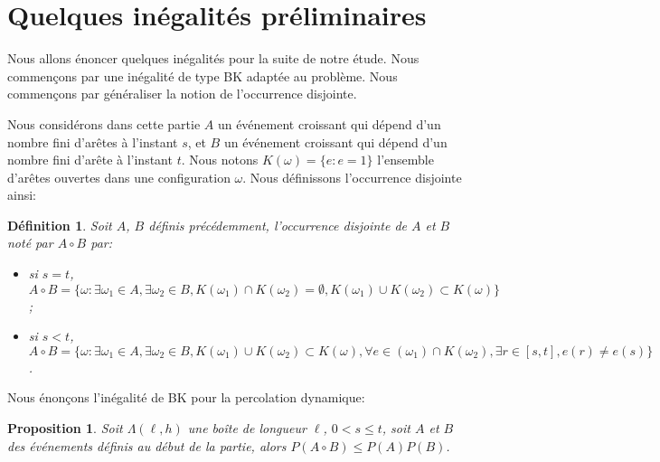 \documentclass[titlepage,a4paper,12pt]{article}
\newcounter{def}
\newcounter{prop}
\newtheorem{occ}[def]{Définition}
\newtheorem{bk}[prop]{Proposition}
\begin{document}
\section{Quelques inégalités préliminaires}
Nous allons énoncer quelques inégalités pour la suite de notre étude. Nous commençons par une inégalité de type BK adaptée au problème. Nous commençons par généraliser la notion de l'occurrence disjointe.

Nous considérons dans cette partie $A$ un événement croissant qui dépend d'un nombre fini d'arêtes à l'instant $s$, et $B$ un événement croissant qui dépend d'un nombre fini d'arête à l'instant $t$. Nous notons $K(\omega) = \{e: e=1\}$ l'ensemble d'arêtes ouvertes dans une configuration $\omega$. Nous définissons l'occurrence disjointe ainsi:
\begin{occ}
Soit $A$, $B$ définis précédemment, l'occurrence disjointe de $A$ et $B$ noté par $A\circ B$ par:
\begin{itemize}[leftmargin=*]
\item si $s=t$, $A\circ B = \{\omega: \exists\omega_1\in A,\exists\omega_2\in B, K(\omega_1)\cap K(\omega_2) = \emptyset, K(\omega_1)\cup K(\omega_2)\subset K(\omega) \}$;
\item si $s<t$, $A\circ B = \{\omega: \exists\omega_1\in A,\exists\omega_2\in B, K(\omega_1)\cup K(\omega_2)\subset K(\omega), \forall e\in (\omega_1)\cap K(\omega_2), \exists r\in [s,t], e(r) \neq e(s) \}$.
\end{itemize}
\end{occ}
Nous énonçons l'inégalité de BK pour la percolation dynamique:


\begin{bk}
Soit $\Lambda(\ell,h)$ une boîte de longueur $\ell$, $0<s\leqslant t$, soit $A$ et $B$ des événements définis au début de la partie, alors $P(A\circ B) \leqslant P(A)P(B)$.
\end{bk}
\end{document}

